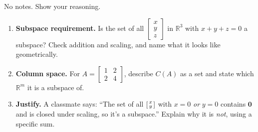 \documentclass[10pt]{article}
\newcommand{\zero}{\mathbf{0}}
\begin{document}
\namedateperiod

\vspace{0.15in}

No notes. Show your reasoning.

\begin{enumerate}[leftmargin=1.8em, itemsep=16pt]
  \item \textbf{Subspace requirement.} Is the set of all $\begin{bmatrix} x \\ y \\ z \end{bmatrix}$
        in $\mathbb{R}^3$ with $x+y+z=0$ a subspace? Check addition and scaling, and name what it
        looks like geometrically.
  \item \textbf{Column space.} For $A=\begin{bmatrix} 1 & 2 \\ 2 & 4 \end{bmatrix}$, describe $C(A)$
        as a set and state which $\mathbb{R}^m$ it is a subspace of.
  \item \textbf{Justify.} A classmate says: ``The set of all $\begin{bsmallmatrix} x\\y \end{bsmallmatrix}$
        with $x=0$ \emph{or} $y=0$ contains $\zero$ and is closed under scaling, so it's a subspace.''
        Explain why it is \emph{not}, using a specific sum.
\end{enumerate}
\end{document}
